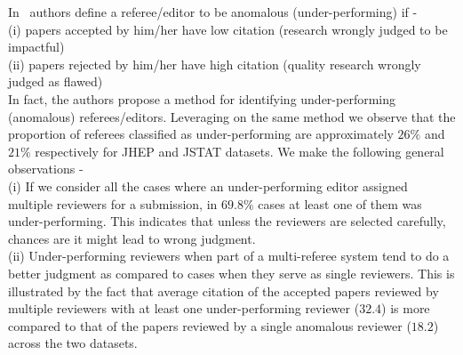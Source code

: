 In~\cite{sikdar2016anomalies} authors define a referee/editor to be anomalous (under-performing) if - \\
(i) papers accepted by him/her have low citation (research wrongly judged to be impactful)\\
(ii) papers rejected by him/her have high citation (quality research wrongly judged as flawed)\\
In fact, the authors propose a method for identifying under-performing (anomalous) referees/editors. Leveraging on the same method we observe that  
 the proportion of referees classified as under-performing are approximately $26\%$ and $21\%$ respectively for JHEP and JSTAT datasets.
We make the following general observations - \\
(i) If we consider all the cases where an under-performing editor assigned multiple reviewers for a submission, in $69.8\%$ cases 
at least one of them was under-performing. This indicates that unless the reviewers are selected carefully, chances are it might lead to wrong judgment.\\
(ii) Under-performing reviewers when part of a multi-referee system tend to do a better judgment as compared to cases when they serve as single reviewers.
This is illustrated by the fact that average citation of the accepted  papers reviewed by multiple reviewers with at least one under-performing reviewer ($32.4$) 
is more compared to that of the papers reviewed by a single anomalous reviewer ($18.2$) across the two datasets.

